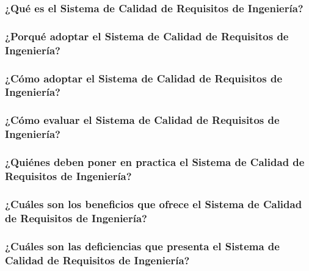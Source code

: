 \documentclass[runningheads,a4paper]{llncs}
\begin{document}
\subsubsection{¿Qué es el Sistema de Calidad de Requisitos de Ingeniería?}

\subsubsection{¿Porqué adoptar el Sistema de Calidad de Requisitos de Ingeniería?}

\subsubsection{¿Cómo adoptar el Sistema de Calidad de Requisitos de Ingeniería?}

\subsubsection{¿Cómo evaluar el Sistema de Calidad de Requisitos de Ingeniería?}

\subsubsection{¿Quiénes deben poner en practica el Sistema de Calidad de Requisitos de Ingeniería?}

\subsubsection{¿Cuáles son los beneficios que ofrece el Sistema de Calidad de Requisitos de Ingeniería?}

\subsubsection{¿Cuáles son las deficiencias que presenta el Sistema de Calidad de Requisitos de Ingeniería?}



\printnoidxglossaries     
         


\end{document}
